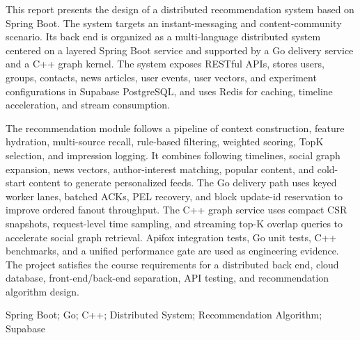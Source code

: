 \vspace{0.15cm}

{\rmfamily{}\setlength{\parindent}{2em}\linespread{1.45}\selectfont
  This report presents the design of a distributed recommendation system based on Spring Boot. The system targets an instant-messaging and content-community scenario. Its back end is organized as a multi-language distributed system centered on a layered Spring Boot service and supported by a Go delivery service and a C++ graph kernel. The system exposes RESTful APIs, stores users, groups, contacts, news articles, user events, user vectors, and experiment configurations in Supabase PostgreSQL, and uses Redis for caching, timeline acceleration, and stream consumption.

  The recommendation module follows a pipeline of context construction, feature hydration, multi-source recall, rule-based filtering, weighted scoring, TopK selection, and impression logging. It combines following timelines, social graph expansion, news vectors, author-interest matching, popular content, and cold-start content to generate personalized feeds. The Go delivery path uses keyed worker lanes, batched ACKs, PEL recovery, and block update-id reservation to improve ordered fanout throughput. The C++ graph service uses compact CSR snapshots, request-level time sampling, and streaming top-K overlap queries to accelerate social graph retrieval. Apifox integration tests, Go unit tests, C++ benchmarks, and a unified performance gate are used as engineering evidence. The project satisfies the course requirements for a distributed back end, cloud database, front-end/back-end separation, API testing, and recommendation algorithm design.

  \vspace{0.45cm}
   Spring Boot; Go; C++; Distributed System; Recommendation Algorithm; Supabase
  \par}
